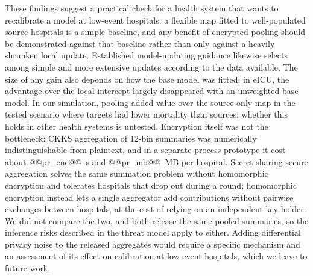 \documentclass[11pt]{article}
\begin{document}
These findings suggest a practical check for a health system that wants to recalibrate a model at low-event hospitals: a flexible map fitted to well-populated source hospitals is a simple baseline, and any benefit of encrypted pooling should be demonstrated against that baseline rather than only against a heavily shrunken local update. Established model-updating guidance likewise selects among simple and more extensive updates according to the data available\cite{janssen2008,vergouwe2017}. The size of any gain also depends on how the base model was fitted: in eICU, the advantage over the local intercept largely disappeared with an unweighted base model. In our simulation, pooling added value over the source-only map in the tested scenario where targets had lower mortality than sources; whether this holds in other health systems is untested. Encryption itself was not the bottleneck: CKKS aggregation of 12-bin summaries was numerically indistinguishable from plaintext, and in a separate-process prototype it cost about @@pr_enc@@~s and @@pr_mb@@~MB per hospital. Secret-sharing secure aggregation solves the same summation problem without homomorphic encryption and tolerates hospitals that drop out during a round\cite{bonawitz2017}; homomorphic encryption instead lets a single aggregator add contributions without pairwise exchanges between hospitals, at the cost of relying on an independent key holder. We did not compare the two, and both release the same pooled summaries, so the inference risks described in the threat model apply to either. Adding differential privacy noise to the released aggregates would require a specific mechanism and an assessment of its effect on calibration at low-event hospitals, which we leave to future work.
\end{document}
